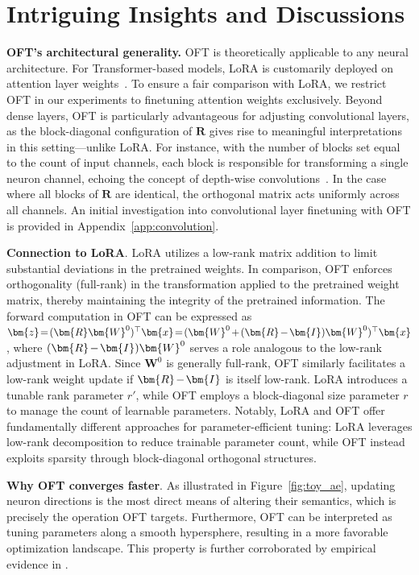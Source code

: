 \section{Intriguing Insights and Discussions}

\textbf{OFT's architectural generality.} OFT is theoretically applicable to any neural architecture. For Transformer-based models, LoRA is customarily deployed on attention layer weights~\cite{hulora2022}. To ensure a fair comparison with LoRA, we restrict OFT in our experiments to finetuning attention weights exclusively. Beyond dense layers, OFT is particularly advantageous for adjusting convolutional layers, as the block-diagonal configuration of $\bm{R}$ gives rise to meaningful interpretations in this setting—unlike LoRA. For instance, with the number of blocks set equal to the count of input channels, each block is responsible for transforming a single neuron channel, echoing the concept of depth-wise convolutions~\cite{chollet2017xception}. In the case where all blocks of $\bm{R}$ are identical, the orthogonal matrix acts uniformly across all channels. An initial investigation into convolutional layer finetuning with OFT is provided in Appendix~\ref{app:convolution}.

\textbf{Connection to LoRA}. LoRA utilizes a low-rank matrix addition to limit substantial deviations in the pretrained weights. In comparison, OFT enforces orthogonality (full-rank) in the transformation applied to the pretrained weight matrix, thereby maintaining the integrity of the pretrained information. The forward computation in OFT can be expressed as $\thickmuskip=2mu \medmuskip=2mu \bm{z}=(\bm{R}\bm{W}^0)^\top\bm{x}=(\bm{W}^0+(\bm{R}-\bm{I})\bm{W}^0)^\top\bm{x}$, where $\thickmuskip=2mu \medmuskip=2mu (\bm{R}-\bm{I})\bm{W}^0$ serves a role analogous to the low-rank adjustment in LoRA. Since $\bm{W}^0$ is generally full-rank, OFT similarly facilitates a low-rank weight update if $\thickmuskip=2mu \medmuskip=2mu \bm{R}-\bm{I}$ is itself low-rank. LoRA introduces a tunable rank parameter $r'$, while OFT employs a block-diagonal size parameter $r$ to manage the count of learnable parameters. Notably, LoRA and OFT offer fundamentally different approaches for parameter-efficient tuning: LoRA leverages low-rank decomposition to reduce trainable parameter count, while OFT instead exploits sparsity through block-diagonal orthogonal structures.

\textbf{Why OFT converges faster}. As illustrated in Figure~\ref{fig:toy_ae}, updating neuron directions is the most direct means of altering their semantics, which is precisely the operation OFT targets. Furthermore, OFT can be interpreted as tuning parameters along a smooth hypersphere, resulting in a more favorable optimization landscape. This property is further corroborated by empirical evidence in \cite{liu2021orthogonal}.

